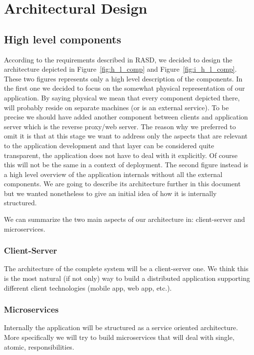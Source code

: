 \pagebreak
\section{Architectural Design}
 
\subsection{High level components}
According to the requirements described in RASD, we decided to design the architecture depicted
in Figure~\ref{fig:h_l_comp} and Figure~\ref{fig:i_h_l_comp}. These two figures represents
only a high level description of the components. In the first one we decided to focus on
the somewhat physical representation of our application. By saying physical we mean that
every component depicted there, will probably reside on separate machines (or is an external service).
To be precise we should have added another component between clients and
application server which is the reverse proxy/web server. The reason why we preferred to
omit it is that at this stage we want to address only the aspects that are relevant to the
application development and that layer can be considered quite transparent, the application
does not have to deal with it explicitly. Of course this will not be the same in a context of deployment.
The second figure instead is a high level overview of the application internals without all
the external components. We are going to describe its architecture further in this document
but we wanted nonetheless to give an initial idea of how it is internally structured.

We can summarize the two main aspects of our architecture in: client-server and microservices.

\subsubsection{Client-Server}
The architecture of the complete system will be a client-server one. We think this is the
most natural (if not only) way to build a distributed application supporting different
client technologies (mobile app, web app, etc.).

\subsubsection{Microservices}
Internally the application will be structured as a service oriented architecture.
More specifically we will try to build microservices that will deal with single, atomic, responsibilities.
\pagebreak

